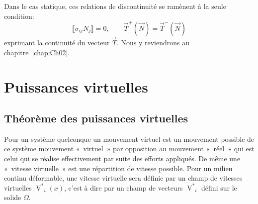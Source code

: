 Dans le cas statique, ces relations de discontinuité se ramènent à la seule condition:
\begin{equation}
    \llbracket\sigma_{ij}N_j\rrbracket=0,\qquad \vec{T}^+(\vec{N})=\vec{T}^-(\vec{N})
    \label{eq:Ch01-022}
\end{equation}
exprimant la continuité du vecteur $\vec{T}$.
Nous y reviendrons au chapitre~\ref{chap:Ch02}.
\section{Puissances virtuelles} \label{sec:Ch01-2}
\subsection{Théorème des puissances virtuelles} \label{ssec:Ch01-2.1}
Pour un système quelconque un mouvement virtuel est un mouvement possible de ce système mouvement «~virtuel~» par opposition au mouvement «~réel~» qui est celui qui se réalise effectivement par suite des efforts appliqués.
De même une «~vitesse virtuelle~» est une répartition de vitesse possible.
Pour un milieu continu déformable, une vitesse virtuelle sera définie par un champ de vitesses virtuelles $\displaystyle{\mathop{V}^{*}}_i(x)$, c'est à dire par un champ de vecteurs $\displaystyle{\mathop{V}^{*}}_i$ défini sur le solide $\Omega$.

